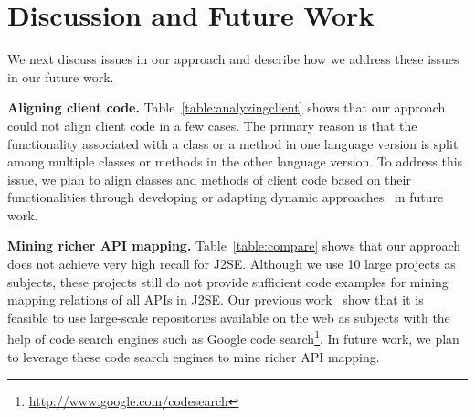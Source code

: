 

\section{Discussion and Future Work}
\label{sec:discuss}

We next discuss issues in our approach and describe how we address
these issues in our future work.

\textbf{Aligning client code.} Table~\ref{table:analyzingclient}
shows that our approach could not align client code in a few cases.
The primary reason is that the functionality associated with a class
or a method in one language version is split among multiple classes
or methods in the other language version. To address this issue, we
plan to align classes and methods of client code based on their
functionalities through developing or adapting dynamic approaches~\cite{jiang2009automatic} in future work.

\textbf{Mining richer API mapping.} Table~\ref{table:compare} shows
that our approach does not achieve very high recall for J2SE. Although we
use 10 large projects as subjects, these projects still do not
provide sufficient code examples for mining mapping relations of all
APIs in J2SE. Our previous
work~\cite{thummalapenta07parseweb,thummalapentaase08spotweb} show
that it is feasible to use large-scale repositories available on the
web as subjects with the help of code search engines such as Google
code search\footnote{\url{http://www.google.com/codesearch}}. In
future work, we plan to leverage these code search engines to mine
richer API mapping.


